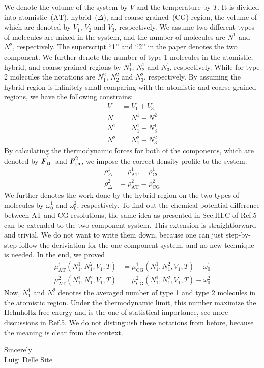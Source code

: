 \documentclass[12pt]{article}
\newcommand{\vect}[1]{\textbf{\textit{#1}}}
\newcommand{\AT}{{\textrm{{AT}}}}
\newcommand{\CG}{{\textrm{CG}}}
\newcommand{\HY}{{\Delta}}
\newcommand{\thf}{{\textrm{th}}}
\begin{document}
 We denote the volume of the system by $V$ and the temperature by
$T$. It is divided into atomistic~($\AT$), hybrid~($\HY$), and
coarse-grained~($\CG$) region, the volume of which are denoted by
$V_1$, $V_2$ and $V_3$, respectively.  We assume two different types
of molecules are mixed in the system, and the number of molecules are
$N^1$ and $N^2$, respectively. The superscript ``1'' and ``2'' in the
paper denotes the two component.  We further denote the number of type
1 molecules in the atomistic, hybrid, and coarse-grained regions by
$N^1_1$, $N^1_2$ and $N^1_3$, respectively. While for type 2 molecules
the notations are $N^2_1$, $N^2_2$ and $N^2_3$, respectively.  By
assuming the hybrid region is infinitely small comparing with the
atomistic and coarse-grained regions, we have the following
constrains:
\begin{align}
  V &= V_1 + V_3\\
  N &= N^1 + N^2\\
  N^1 &= N^1_1 + N^1_3\\
  N^2 &= N^2_1 + N^2_3
\end{align}
By calculating the thermodynamic forces for both of the components, which
are denoted by $\vect F^1_\thf$ and $\vect F^2_\thf$,
we impose the correct density profile to the system:
\begin{align}
  \rho_\HY^1 &= \rho_\AT^1 = \rho_\CG^1\\
  \rho_\HY^2 &= \rho_\AT^2 = \rho_\CG^2
\end{align}
We further denotes the work done by the hybrid region on the two types
of molecules by $\omega_0^1$ and $\omega_0^2$, respectively.
To find out the chemical potential difference between AT and CG resolutions,
the same idea as presented in Sec.III.C of Ref.5 can be extended
to the two component system. This extension is straightforward and trivial. We do not want
to write them down, because one can just step-by-step follow the
deriviation for the one component system, and no new technique is needed.
In the end, we proved
\begin{align}
  \mu^1_\AT(N^1_1, N^2_1, V_1, T) &= \mu^1_\CG(N^1_1, N^2_1, V_1, T) - \omega^1_0\\
  \mu^2_\AT(N^1_1, N^2_1, V_1, T) &= \mu^2_\CG(N^1_1, N^2_1, V_1, T) - \omega^2_0
\end{align}
Now, $N^1_1$ and $N^2_1$ denotes the averaged number of type 1 and
type 2 molecules in the atomistic region.  Under the thermodynamic
limit, this number maximize the Helmholtz free energy and is the one
of statistical importance, see more discussions in
Ref.5. We do not distinguish these notations from
before, because the meaning is clear from the context.











Sincerely\\

Luigi Delle Site
\end{document}
